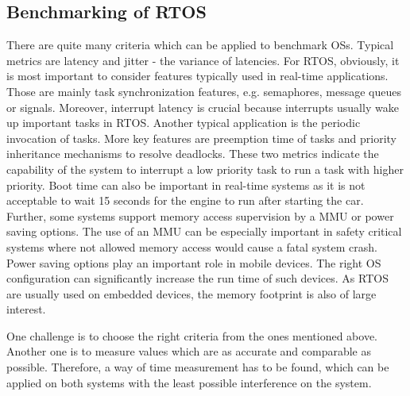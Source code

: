 \subsection{Benchmarking of RTOS}
There are quite many criteria which can be applied to benchmark \acp{OS}.
Typical metrics are latency and jitter - the variance of latencies.
For \ac{RTOS}, obviously, it is most important to consider features typically used in real-time applications.
Those are mainly task synchronization features, e.g. semaphores, message queues or signals.
Moreover, interrupt latency is crucial because interrupts usually wake up important tasks in \ac{RTOS}.
Another typical application is the periodic invocation of tasks. 
More key features are preemption time of tasks and priority inheritance mechanisms to resolve deadlocks.
These two metrics indicate the capability of the system to interrupt a low priority task to run a task with higher priority. 
Boot time can also be important in real-time systems as it is not acceptable to wait 15 seconds for the engine to run after starting the car.
Further, some systems support memory access supervision by a \ac{MMU} or power saving options.
The use of an \ac{MMU} can be especially important in safety critical systems where not allowed memory access would cause a fatal system crash.
Power saving options play an important role in mobile devices.
The right \ac{OS} configuration can significantly increase the run time of such devices.
As \ac{RTOS} are usually used on embedded devices, the memory footprint is also of large interest. 
\par
One challenge is to choose the right criteria from the ones mentioned above. 
Another one is to measure values which are as accurate and comparable as possible.
Therefore, a way of time measurement has to be found, which can be applied on both systems with the least possible interference on the system.

